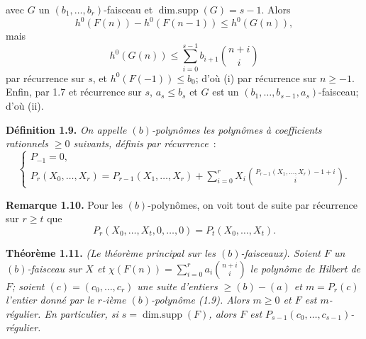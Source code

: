 avec \(G\) un \((b_1,\ldots,b_r)\)-faisceau et \(\operatorname{dim{.}supp}(G)=s-1\). Alors
\[
h^0(F(n))-h^0(F(n-1))\le h^0(G(n)),
\]
mais
\[
h^0(G(n))\le\sum_{i=0}^{s-1}b_{i+1}\binom{n+i}{i}
\]
par récurrence sur \(s\), et \(h^0(F(-1))\le b_0\); d'où (i) par récurrence sur \(n\ge -1\). Enfin, par 1.7 et récurrence sur \(s\), \(a_s\le b_s\) et \(G\) est un \((b_1,\ldots,b_{s-1},a_s)\)-faisceau; d'où (ii).

\textbf{Définition 1.9.} \emph{On appelle \emph{\((b)\)-polynômes} les polynômes à coefficients rationnels \(\ge0\) suivants, définis par récurrence}~:
\[
\begin{cases}
P_{-1}=0,\\
P_r(X_0,\ldots,X_r)=P_{r-1}(X_1,\ldots,X_r)
+\displaystyle\sum_{i=0}^{r}X_i
\binom{P_{r-1}(X_1,\ldots,X_r)-1+i}{i}.
\end{cases}
\]

\textbf{Remarque 1.10.} Pour les \((b)\)-polynômes, on voit tout de suite par récurrence sur \(r\ge t\) que
\[
P_r(X_0,\ldots,X_t,0,\ldots,0)=P_t(X_0,\ldots,X_t).
\]

\textbf{Théorème 1.11.} \emph{(Le théorème principal sur les \((b)\)-faisceaux). Soient \(F\) un \((b)\)-faisceau sur \(X\) et \(\chi(F(n))=\sum_{i=0}^{r}a_i\binom{n+i}{i}\) le polynôme de Hilbert de \(F\); soient \((c)=(c_0,\ldots,c_r)\) une suite d'entiers \(\ge (b)-(a)\) et \(m=P_r(c)\) l'entier donné par le \(r\)-ième \((b)\)-polynôme (1.9). Alors \(m\ge0\) et \(F\) est \(m\)-régulier. En particulier, si \(s=\operatorname{dim{.}supp}(F)\), alors \(F\) est \(P_{s-1}(c_0,\ldots,c_{s-1})\)-régulier.}

